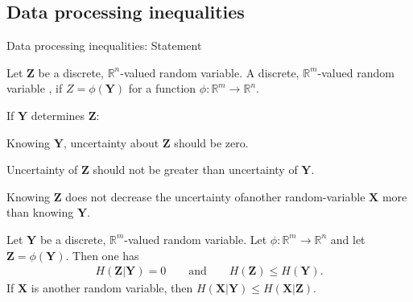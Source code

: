 \subsection{Data processing inequalities}
\begin{frame}{Data processing inequalities: Statement}
\begin{definition}
Let $\mathbf{Z}$ be a discrete, $\mathbb{R}^n$-valued random variable. A discrete, $\mathbb{R}^m$-valued random variable , if $Z=\phi(\mathbf{Y})$ for 
a function $\phi:\mathbb{R}^m\to\mathbb{R}^n$.
\end{definition}
\vspace{-2.5mm}

 If $\mathbf{Y}$ determines $\mathbf{Z}$:
\bit%
\item Knowing $\mathbf{Y}$, uncertainty about $\mathbf{Z}$ should be zero.
\item Uncertainty of $\mathbf{Z}$ should not be greater than uncertainty of $\mathbf{Y}$.
\item Knowing $\mathbf{Z}$ does not decrease the uncertainty ofanother random-variable $\mathbf{X}$ more than knowing $\mathbf{Y}$.    
\eit 
{}
\begin{proposition}
Let $\mathbf{Y}$ be a discrete, $\mathbb{R}^m$-valued random variable. Let 
$\phi:\mathbb{R}^m\to\mathbb{R}^n$ and let $\mathbf{Z}=\phi(\mathbf{Y})$. 
Then one has 
\begin{align*}
H(\mathbf{Z}|\mathbf{Y})=0 \qquad\text{and} \qquad H(\mathbf{Z})\leq H(\mathbf{Y}).  
\end{align*}
If $\mathbf{X}$ is another random variable, then 
$H(\mathbf{X}|\mathbf{Y})\leq H(\mathbf{X}|\mathbf{Z})$. 
\end{proposition}
\end{frame}

